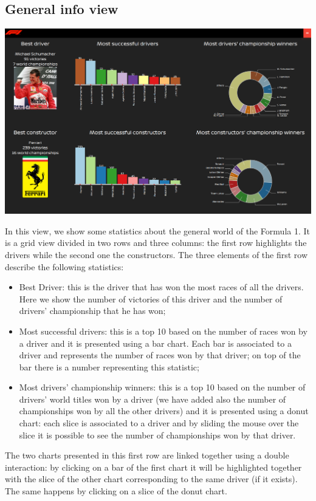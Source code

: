 \documentclass[11pt,twocolumn,letterpaper]{article}
\begin{document}
\subsection{General info view}
\begin{center}
	\centering
	\includegraphics[width=\columnwidth]{generalinfo}
\end{center}
In this view, we show some statistics about the general world of the Formula 1. It is a grid view divided in two rows and three columns: the first row highlights the drivers while the second one the constructors. The three elements of the first row describe the following statistics:
\begin{itemize}
	\item Best Driver: this is the driver that has won the most races of all the drivers. Here we show the number of victories of this driver and the number of drivers' championship that he has won;
	\item Most successful drivers: this is a top 10 based on the number of races won by a driver and it is presented using a bar chart. Each bar is associated to a driver and represents the number of races won by that driver; on top of the bar there is a number representing this statistic;
	\item Most drivers' championship winners: this is a top 10 based on the number of drivers' world titles won by a driver (we have added also the number of championships won by all the other drivers) and it is presented using a donut chart: each slice is associated to a driver and by sliding the mouse over the slice it is possible to see the number of championships won by that driver.
\end{itemize}
The two charts presented in this first row are linked together using a double interaction: by clicking on a bar of the first chart it will be highlighted together with the slice of the other chart corresponding to the same driver (if it exists). The same happens by clicking on a slice of the donut chart.\\
\end{document}
